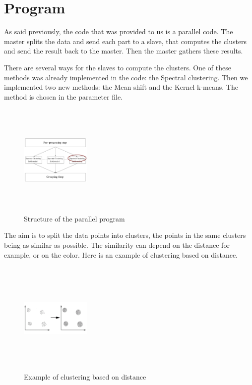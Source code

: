 \section{Program}
As said previously, the code that was provided to us is a parallel code. The master splits the data and send each part to a slave, that computes the clusters and send the result back to the master. Then the master gathers these results.

There are several ways for the slaves to compute the clusters. One of these methods was already implemented in the code: the Spectral clustering. Then we implemented two new methods: the Mean shift and the Kernel k-means. The method is chosen in the parameter file.
\begin{figure}[h!]
\includegraphics[width=0.3\textwidth, height=5.5cm]{Image/parallel2.png}\centering
\caption{Structure of the parallel program}
\end{figure}

The aim is to split the data points into clusters, the points in the same clusters being as similar as possible. The similarity can depend on the distance for example, or on the color. Here is an example of clustering based on distance.
\begin{figure}[h!]
\includegraphics[width=0.3\textwidth, height=5.5cm]{Image/clust.png}\centering
\caption{Example of clustering based on distance}
\end{figure}